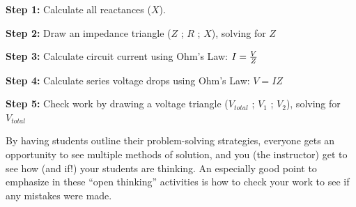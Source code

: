 \vskip 10pt

\goodbreak

{\bf Step 1:} Calculate all reactances ($X$).

{\bf Step 2:} Draw an impedance triangle ($Z$ ; $R$ ; $X$), solving for $Z$

{\bf Step 3:} Calculate circuit current using Ohm's Law: $I = {V \over Z}$

{\bf Step 4:} Calculate series voltage drops using Ohm's Law: $V = {I Z}$

{\bf Step 5:} Check work by drawing a voltage triangle ($V_{total}$ ; $V_1$ ; $V_2$), solving for $V_{total}$

\vskip 10pt

By having students outline their problem-solving strategies, everyone gets an opportunity to see multiple methods of solution, and you (the instructor) get to see how (and if!) your students are thinking.  An especially good point to emphasize in these ``open thinking'' activities is how to check your work to see if any mistakes were made.





